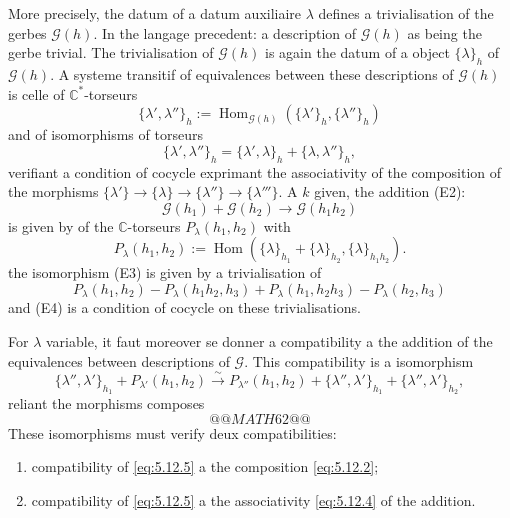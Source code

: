 \documentclass[12pt,a4paper]{article}
\theoremstyle{plain}
\theoremstyle{definition}
\theoremstyle{remark}
\DeclareMathOperator{\Hom}{Hom}
\newcommand{\C}{\mathbb{C}}
\providecommand{\Hom}{\operatorname{Hom}}
\begin{document}
More precisely, the datum of a datum auxiliaire $\lambda$ defines a trivialisation
of the gerbes $\mathscr{G}(h)$. In the langage precedent: a description of $\mathscr{G}(h)$ as being the
gerbe trivial. The trivialisation of $\mathscr{G}(h)$ is again the datum of a object $\{\lambda\}_h$ of $\mathscr{G}(h)$.
A systeme transitif of equivalences between these descriptions of $\mathscr{G}(h)$ is celle of $\C^*$-torseurs
\begin{equation}\label{eq:5.12.1}
\{\lambda', \lambda''\}_h := \Hom_{\mathscr{G}(h)}(\{\lambda'\}_h, \{\lambda''\}_h)
\end{equation}
and of isomorphisms of torseurs
\begin{equation}\label{eq:5.12.2}
\{\lambda', \lambda''\}_h = \{\lambda', \lambda\}_h + \{\lambda, \lambda''\}_h,
\end{equation}
verifiant a condition of cocycle exprimant the associativity of the composition of the morphisms $\{\lambda'\} \to \{\lambda\} \to \{\lambda''\} \to \{\lambda'''\}$. A $k$ given, the addition (E2):
\[
\mathscr{G}(h_1) + \mathscr{G}(h_2) \to \mathscr{G}(h_1 h_2)
\]
is given by of the $\C$-torseurs $P_\lambda(h_1, h_2)$ with
\begin{equation}\label{eq:5.12.3}
P_\lambda(h_1, h_2) := \Hom(\{\lambda\}_{h_1} + \{\lambda\}_{h_2}, \{\lambda\}_{h_1 h_2}).
\end{equation}
the isomorphism (E3) is given by a trivialisation of
\begin{equation}\label{eq:5.12.4}
P_\lambda(h_1, h_2) - P_\lambda(h_1 h_2, h_3) + P_\lambda(h_1, h_2 h_3) - P_\lambda(h_2, h_3)
\end{equation}
and (E4) is a condition of cocycle on these trivialisations.

For $\lambda$ variable, it faut moreover se donner a compatibility a the addition of the equivalences between descriptions of $\mathscr{G}$. This compatibility is a isomorphism
\begin{equation}\label{eq:5.12.5}
\{\lambda'', \lambda'\}_{h_1} + P_{\lambda'}(h_1, h_2) \xrightarrow{\sim} P_{\lambda''}(h_1, h_2) + \{\lambda'', \lambda'\}_{h_1} + \{\lambda'', \lambda'\}_{h_2},
\end{equation}
reliant the morphisms composes
\[
@@MATH62@@
\]
These isomorphisms must verify deux compatibilities:
\begin{enumerate}[label=\alph*)]
\item compatibility of \eqref{eq:5.12.5} a the composition \eqref{eq:5.12.2};
\item compatibility of \eqref{eq:5.12.5} a the associativity \eqref{eq:5.12.4} of the addition.
\end{enumerate}
\end{document}
